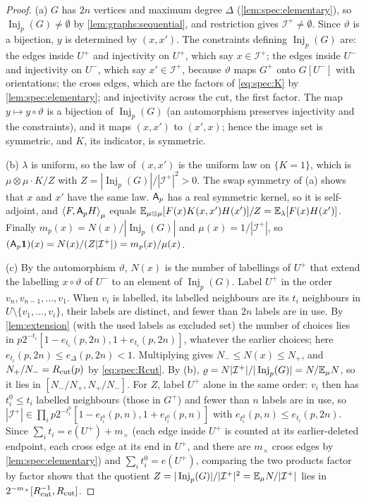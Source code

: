 \begin{proof}
(a) $G$ has $2n$ vertices and maximum degree $\Delta$
(\cref{lem:spec:elementary}), so $\operatorname{Inj}_p(G)\ne\emptyset$ by
\cref{lem:graphs:sequential}, and restriction gives $\mathcal
I^+\ne\emptyset$. Since $\vartheta$ is a bijection, $y$ is determined by
$(x,x')$. The constraints defining $\operatorname{Inj}_p(G)$ are: the edges
inside $U^+$ and injectivity on $U^+$, which say $x\in\mathcal I^+$; the edges
inside $U^-$ and injectivity on $U^-$, which say $x'\in\mathcal I^+$, because
$\vartheta$ maps $G^+$ onto $G[U^-]$ with orientations; the cross edges, which
are the factors of \eqref{eq:spec:K} by \cref{lem:spec:elementary}; and
injectivity across the cut, the first factor. The map $y\mapsto y\circ\vartheta$
is a bijection of $\operatorname{Inj}_p(G)$ (an automorphism preserves
injectivity and the constraints), and it maps $(x,x')$ to $(x',x)$; hence the
image set is symmetric, and $K$, its indicator, is symmetric.

(b) $\lambda$ is uniform, so the law of $(x,x')$ is the uniform law on
$\{K=1\}$, which is $\mu\otimes\mu\cdot K/Z$ with
$Z=|\operatorname{Inj}_p(G)|/|\mathcal I^+|^2>0$. The swap symmetry of (a)
shows that $x$ and $x'$ have the same law. $\mathsf A_p$ has a real symmetric kernel,
so it is self-adjoint, and $\left\langle F,\mathsf A_p H\right\rangle_\mu$ equals
$\mathbb E_{\mu\otimes\mu}[F(x)K(x,x')H(x')]/Z=\mathbb E_\lambda[F(x)H(x')]$. Finally
$m_p(x)=N(x)/|\operatorname{Inj}_p(G)|$ and $\mu(x)=1/|\mathcal I^+|$, so
$(\mathsf A_p\mathbf 1)(x)=N(x)/(Z|\mathcal I^+|)=m_p(x)/\mu(x)$.

(c) By the automorphism $\vartheta$, $N(x)$ is the number of labellings of
$U^+$ that extend the labelling $x\circ\vartheta$ of $U^-$ to an element of
$\operatorname{Inj}_p(G)$. Label $U^+$ in the order $v_n,v_{n-1},\dots,v_1$.
When $v_i$ is labelled, its labelled neighbours are its $t_i$ neighbours in
$U\setminus\{v_1,\dots,v_i\}$, their labels are distinct, and fewer than $2n$
labels are in use. By \cref{lem:extension} (with the used labels as excluded
set) the number of choices lies in
$p2^{-t_i}[1-e_{t_i}(p,2n),1+e_{t_i}(p,2n)]$, whatever the earlier choices;
here $e_{t_i}(p,2n)\le e_\Delta(p,2n)<1$. Multiplying gives $N_-\le N(x)\le
N_+$, and $N_+/N_-=R_{\mathrm{cut}}(p)$ by \eqref{eq:spec:Rcut}. By (b),
$\varrho=N|\mathcal I^+|/|\operatorname{Inj}_p(G)|=N/\mathbb E_\mu N$, so it lies in
$[N_-/N_+,N_+/N_-]$. For $Z$, label $U^+$
alone in the same order: $v_i$ then has $t^0_i\le t_i$ labelled neighbours
(those in $G^+$) and fewer than $n$ labels are in use, so
$|\mathcal I^+|\in\prod_ip2^{-t^0_i}[1-e_{t^0_i}(p,n),1+e_{t^0_i}(p,n)]$ with
$e_{t^0_i}(p,n)\le e_{t_i}(p,2n)$. Since $\sum_it_i=e(U^+)+m_\times$ (each edge
inside $U^+$ is counted at its earlier-deleted endpoint, each cross edge at its
end in $U^+$, and there are $m_\times$ cross edges by
\cref{lem:spec:elementary}) and $\sum_it^0_i=e(U^+)$, comparing the two
products factor by factor shows that the quotient
$Z=|\operatorname{Inj}_p(G)|/|\mathcal I^+|^2=\mathbb E_\mu N/|\mathcal I^+|$ lies in
$2^{-m_\times}[R_{\mathrm{cut}}^{-1},R_{\mathrm{cut}}]$.


\end{proof}
